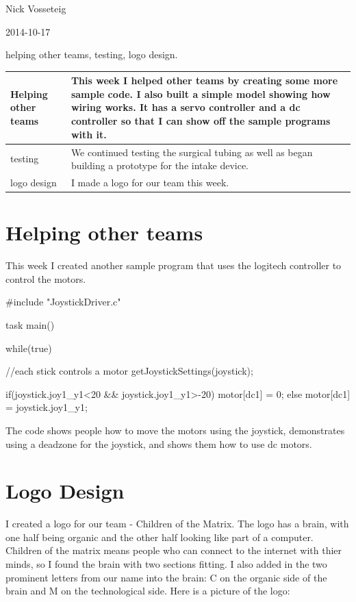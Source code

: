 \usepackage{listings}

Nick Vosseteig

2014-10-17

helping other teams, testing, logo design.

\begin{tabular}{|p{5cm}|p{5cm}|}
 \hline
 Helping other teams&
This week I helped other teams by creating some more sample code. I also built a simple model showing how wiring works. It has a servo controller and a dc controller so that I can show off the sample programs with it. 
 \\
 \hline
testing&
We continued testing the surgical tubing as well as began building a prototype for the intake device.
 \\
 \hline
 logo design&
I made a logo for our team this week.
 \\
 \hline
\end{tabular}

\section*{Helping other teams}
This week I created another sample program that uses the logitech controller to control the motors. 
\begin{listing}	
#include "JoystickDriver.c"

task main()
{

	while(true)
	{
		//each stick controls a motor
		getJoystickSettings(joystick);

		if(joystick.joy1_y1<20 && joystick.joy1_y1>-20){
			motor[dc1] = 0;
			}else{
			motor[dc1] = joystick.joy1_y1;
		}
	}
}
\end{listing}
The code shows people how to move the motors using the joystick, demonstrates using a deadzone for the joystick, and shows them how to use dc motors.

\section*{Logo Design}
I created a logo for our team - Children of the Matrix. The logo has a brain, with one half being organic and the other half looking like part of a computer. Children of the matrix means people who can connect to the internet with thier minds, so I found the brain with two sections fitting. I also added in the two prominent letters from our name into the brain: C on the organic side of the brain and M on the technological side.
Here is a picture of the logo:


